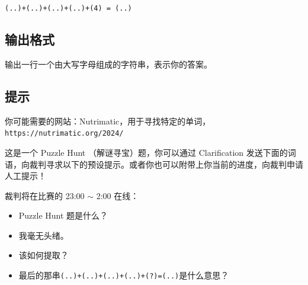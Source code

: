 \texttt{(..)+(..)+(..)+(..)+(4) = (..)}

\subsection{输出格式}

输出一行一个由大写字母组成的字符串，表示你的答案。



\subsection{提示}

你可能需要的网站：Nutrimatic，用于寻找特定的单词，\texttt{https://nutrimatic.org/2024/}

这是一个 Puzzle Hunt （解谜寻宝）题，你可以通过 Clarification 发送下面的词语，向裁判寻求以下的预设提示。或者你也可以附带上你当前的进度，向裁判申请人工提示！

裁判将在比赛的 23:00 $\sim$ 2:00 在线：

\begin{itemize}
   \item Puzzle Hunt 题是什么？
   \item 我毫无头绪。
   \item 该如何提取？
   \item 最后的那串\texttt{(..)+(..)+(..)+(..)+(?)=(..)}是什么意思？
\end{itemize}
